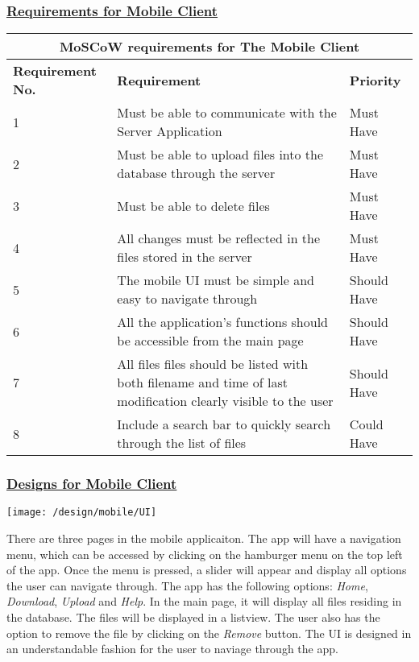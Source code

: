 \documentclass{article}
\begin{document}
\subsubsection{\underline{Requirements for Mobile Client}}
\begin{tabular}{|p{3cm}|p{5cm}|p{4cm}|}
\hline
\multicolumn{3}{|c|}{\textbf{MoSCoW requirements for The Mobile Client}} \\
\hline
\textbf{Requirement No.} & \textbf{Requirement} & \textbf{Priority}\\
\hline
1 & Must be able to communicate with the Server Application & Must Have \\
\hline
2 & Must be able to upload files into the database through the server & Must Have \\
\hline
3 & Must be able to delete files & Must Have \\
\hline
4 & All changes must be reflected in the files stored in the server & Must Have \\
\hline
5 & The mobile UI must be simple and easy to navigate through & Should Have \\
\hline
6 & All the application's functions should be accessible from the main page & Should Have \\
\hline
7 & All files files should be listed with both filename and time of last modification clearly visible to the user & Should Have \\
\hline
8 & Include a search bar to quickly search through the list of files & Could Have \\
\hline
\end{tabular}

\subsubsection{\underline{Designs for Mobile Client}}

\texttt{[image: /design/mobile/UI]}

There are three pages in the mobile applicaiton. The app will have a navigation menu, which can be accessed by clicking on the hamburger menu on the top left of the app. Once the menu is pressed, a slider will appear and display all options the user can navigate through. The app has the following options: \textit{Home}, \textit{Download}, \textit{Upload} and \textit{Help}. In the main page, it will display all files residing in the database. The files will be displayed in a listview. The user also has the option to remove the file by clicking on the \textit{Remove} button. The UI is designed in an understandable fashion for the user to naviage through the app.
\end{document}
